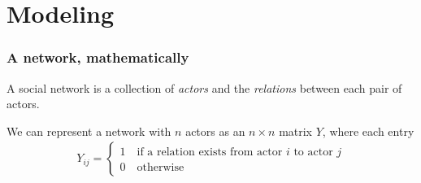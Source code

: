 \documentclass[slidestop,compress, 10pt]{beamer}
\begin{document}
\section{Modeling}
\frame
{
\frametitle{A network, mathematically}

A social network is a collection of \emph{actors} and the \emph{relations} between each pair of actors.  

We can represent a network with $n$ actors as an $n \times n$ matrix $Y$, where each entry
\begin{align*}
	Y_{ij} =
	\begin{cases} 	1 \quad \text{if a relation exists from actor $i$ to actor $j$}\\
					0 \quad \text{otherwise}
	\end{cases}
\end{align*}
\pause

}
\end{document}

